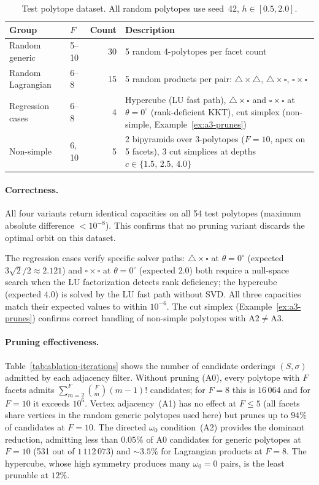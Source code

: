 \begin{table}[h]
\centering
\begin{tabular}{llrp{5.5cm}}
\toprule
Group & $F$ & Count & Description \\
\midrule
Random generic    & 5--10 & 30 & 5 random 4-polytopes per facet count \\
Random Lagrangian & 6--8 & 15 & 5 random products per pair:
  $\triangle{\times}\triangle$,
  $\triangle{\times}\square$,
  $\square{\times}\square$ \\
Regression cases  & 6--8 &  4 & Hypercube (LU fast path),
  $\triangle{\times}\square$ and $\square{\times}\square$ at $\theta{=}0^\circ$
  (rank-deficient KKT), cut simplex (non-simple, Example~\ref{ex:a3-prunes}) \\
Non-simple        & 6, 10 &  5 & 2 bipyramids over 3-polytopes ($F{=}10$,
  apex on 5 facets), 3 cut simplices at depths $c \in \{1.5,\, 2.5,\, 4.0\}$ \\
\bottomrule
\end{tabular}
\caption{Test polytope dataset. All random polytopes use seed~42, $h \in [0.5, 2.0]$.}
\label{tab:ablation-dataset}
\end{table}

\paragraph{Correctness.}
All four variants return identical capacities on all 54 test polytopes (maximum
absolute difference $< 10^{-8}$).
This confirms that no pruning variant discards the optimal orbit on this dataset.

The regression cases verify specific solver paths:
$\triangle{\times}\square$ at $\theta{=}0^\circ$ (expected $3\sqrt{2}/2 \approx 2.121$) and
$\square{\times}\square$ at $\theta{=}0^\circ$ (expected $2.0$) both require a null-space search
when the LU factorization detects rank deficiency;
the hypercube (expected $4.0$) is solved by the LU fast path without SVD.
All three capacities match their expected values to within $10^{-6}$.
The cut simplex (Example~\ref{ex:a3-prunes}) confirms correct handling of
non-simple polytopes with $\mathrm{A2} \neq \mathrm{A3}$.

\paragraph{Pruning effectiveness.}
Table~\ref{tab:ablation-iterations} shows the number of candidate orderings
$(S, \sigma)$ admitted by each adjacency filter.
Without pruning (A0), every polytope with $F$ facets admits
$\sum_{m=2}^{F} \binom{F}{m} (m-1)!$ candidates;
for $F = 8$ this is $16\,064$ and for $F = 10$ it exceeds $10^6$.
Vertex adjacency~(A1) has no effect at $F \le 5$ (all facets share vertices in
the random generic polytopes used here) but prunes up to $94\%$ of candidates
at $F = 10$.
The directed $\omega_0$ condition~(A2) provides the dominant reduction,
admitting less than $0.05\%$ of A0 candidates for generic polytopes at $F = 10$
(531 out of $1\,112\,073$) and ${\sim}3.5\%$ for Lagrangian products at $F = 8$.
The hypercube, whose high symmetry produces many $\omega_0 = 0$ pairs,
is the least prunable at $12\%$.


